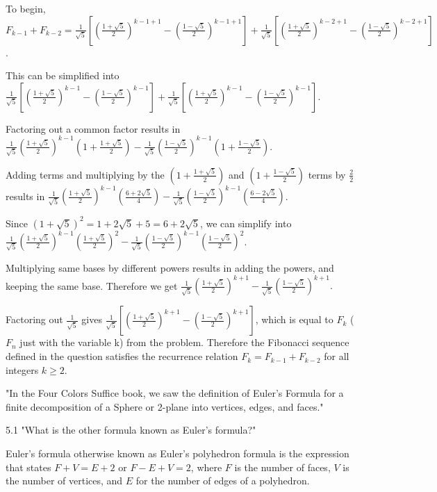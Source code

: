\documentclass{article}
\begin{document}
\item To begin, $F_{k-1}+F_{k-2} = \frac{1}{\sqrt{5}}[(\frac{1 + \sqrt{5}}{2})^{k-1+1} - (\frac{1 - \sqrt{5}}{2})^{k-1+1}] + \frac{1}{\sqrt{5}}[(\frac{1 + \sqrt{5}}{2})^{k-2+1} - (\frac{1 - \sqrt{5}}{2})^{k-2+1}]$.
\item This can be simplified into $ \frac{1}{\sqrt{5}}[(\frac{1 + \sqrt{5}}{2})^{k-1} - (\frac{1 - \sqrt{5}}{2})^{k-1}] + \frac{1}{\sqrt{5}}[(\frac{1 + \sqrt{5}}{2})^{k-1} - (\frac{1 - \sqrt{5}}{2})^{k-1}]$.
\item Factoring out a common factor results in $ \frac{1}{\sqrt{5}}(\frac{1 + \sqrt{5}}{2})^{k-1}(1 + \frac{1 + \sqrt{5}}{2}) - \frac{1}{\sqrt{5}}(\frac{1 - \sqrt{5}}{2})^{k-1}(1 + \frac{1 - \sqrt{5}}{2})$.
\item Adding terms and multiplying by the $(1 + \frac{1 + \sqrt{5}}{2})$ and $(1 + \frac{1 - \sqrt{5}}{2})$ terms by $\frac{2}{2}$ results in $ \frac{1}{\sqrt{5}}(\frac{1 + \sqrt{5}}{2})^{k-1}(\frac{6 + 2\sqrt{5}}{4}) - \frac{1}{\sqrt{5}}(\frac{1 - \sqrt{5}}{2})^{k-1}(\frac{6 - 2\sqrt{5}}{4})$.
\item Since $(1+\sqrt{5})^2 = 1 + 2\sqrt{5} + 5 = 6 + 2\sqrt{5}$, we can simplify into $ \frac{1}{\sqrt{5}}(\frac{1 + \sqrt{5}}{2})^{k-1}(\frac{1 + \sqrt{5}}{2})^2 - \frac{1}{\sqrt{5}}(\frac{1 - \sqrt{5}}{2})^{k-1}(\frac{1 - \sqrt{5}}{2})^2$.
\item Multiplying same bases by different powers results in adding the powers, and keeping the same base. Therefore we get $ \frac{1}{\sqrt{5}}(\frac{1 + \sqrt{5}}{2})^{k+1} - \frac{1}{\sqrt{5}}(\frac{1 - \sqrt{5}}{2})^{k+1}.$ 
\item Factoring out $\frac{1}{\sqrt{5}}$ gives $\frac{1}{\sqrt{5}}[(\frac{1 + \sqrt{5}}{2})^{k+1} - (\frac{1 - \sqrt{5}}{2})^{k+1}]$, which is equal to $F_k$ ($F_n$ just with the variable k) from the problem. Therefore the Fibonacci sequence defined in the question satisfies the recurrence relation $F_k = F_{k-1}+F_{k-2}$ for all integers $k\geq2$.


\clearpage
\header

\item "In the Four Colors Suffice book, we saw the definition of Euler's Formula for a finite decomposition of a Sphere or 2-plane into vertices, edges, and faces."

5.1 "What is the other formula known as Euler's formula?"

Euler's formula otherwise known as Euler's polyhedron formula is the expression that states $F + V = E + 2$ or $F - E + V = 2$, where $F$ is the number of faces, $V$ is the number of vertices, and $E$ for the number of edges of a polyhedron.
\end{document}
